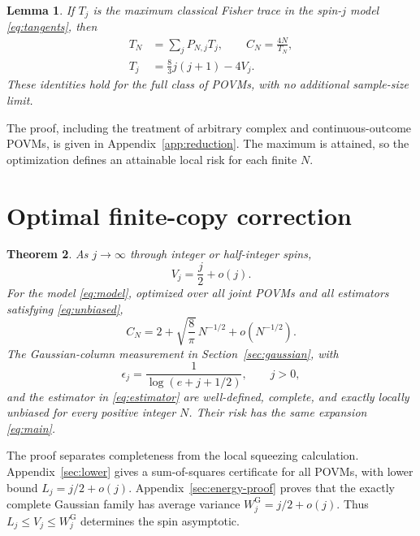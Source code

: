 \documentclass[aps,pra,reprint,superscriptaddress]{revtex4-2}
\newtheorem{theorem}{Theorem}
\newtheorem{lemma}[theorem]{Lemma}
\theoremstyle{remark}
\newcommand{\g}{\mathrm G}
\begin{document}
\begin{lemma}\label{lem:reduction}
If $T_j$ is the maximum classical Fisher trace in the spin-$j$ model
\eqref{eq:tangents}, then
\begin{equation}
\begin{aligned}
T_N&=\sum_jP_{N,j}T_j,\qquad C_N=\frac{4N}{T_N},\\
T_j&=\frac83j(j+1)-4V_j.
\end{aligned}
\label{eq:reductions}
\end{equation}
These identities hold for the full class of POVMs, with no additional
sample-size limit.
\end{lemma}

The proof, including the treatment of arbitrary complex and
continuous-outcome POVMs, is given in Appendix~\ref{app:reduction}.
The maximum is attained, so the optimization defines an
attainable local risk for each finite $N$.

\section{Optimal finite-copy correction}\label{sec:result}
\begin{theorem}\label{thm:main}As $j\to\infty$ through integer or half-integer spins,
\begin{equation}
 V_j=\frac j2+o(j).
 \label{eq:roof-asymptotic}
\end{equation}
For the model \eqref{eq:model}, optimized over all joint POVMs and all
estimators satisfying \eqref{eq:unbiased},
\begin{equation}
 \boxed{\displaystyle
 C_N=2+\sqrt{\frac8\pi}\,N^{-1/2}+o(N^{-1/2}).}
 \label{eq:main}
\end{equation}
The Gaussian-column measurement in Section~\ref{sec:gaussian}, with
\begin{equation}
 \epsilon_j=\frac1{\log(e+j+1/2)},\qquad j>0,
 \label{eq:epsilon}
\end{equation}
and the estimator in \eqref{eq:estimator} are well-defined, complete,
and exactly locally unbiased for every positive integer $N$. Their
risk has the same expansion \eqref{eq:main}.
\end{theorem}


The proof separates completeness from the local squeezing
calculation. Appendix~\ref{sec:lower} gives a sum-of-squares
certificate for all POVMs, with lower bound $L_j=j/2+o(j)$.
Appendix~\ref{sec:energy-proof} proves that the exactly complete
Gaussian family has average variance $W_j^{\g}=j/2+o(j)$.
Thus $L_j\leq V_j\leq W_j^{\g}$ determines the spin asymptotic.
\end{document}
